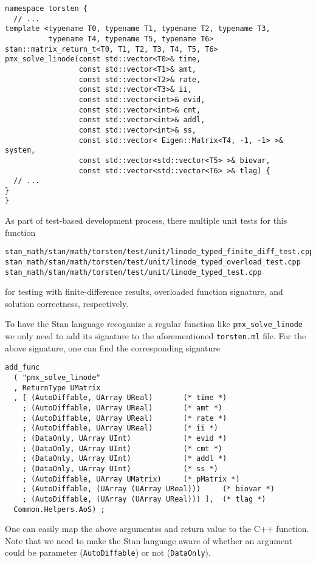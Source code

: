 \documentclass[12pt, reqno, oneside]{amsbook}
\numberwithin{equation}{chapter}
\numberwithin{figure}{chapter}
\numberwithin{table}{chapter}
\theoremstyle{remark}
\begin{document}
\begin{verbatim}
namespace torsten {
  // ...
template <typename T0, typename T1, typename T2, typename T3,
          typename T4, typename T5, typename T6>
stan::matrix_return_t<T0, T1, T2, T3, T4, T5, T6>
pmx_solve_linode(const std::vector<T0>& time,
                 const std::vector<T1>& amt,
                 const std::vector<T2>& rate,
                 const std::vector<T3>& ii,
                 const std::vector<int>& evid,
                 const std::vector<int>& cmt,
                 const std::vector<int>& addl,
                 const std::vector<int>& ss,
                 const std::vector< Eigen::Matrix<T4, -1, -1> >& system,
                 const std::vector<std::vector<T5> >& biovar,
                 const std::vector<std::vector<T6> >& tlag) {
  // ...
}
}
\end{verbatim}

As part of test-based development process, there multiple unit tests for this function
\begin{verbatim}
stan_math/stan/math/torsten/test/unit/linode_typed_finite_diff_test.cpp
stan_math/stan/math/torsten/test/unit/linode_typed_overload_test.cpp
stan_math/stan/math/torsten/test/unit/linode_typed_test.cpp
\end{verbatim}
for testing with finite-difference results, overloaded function
signature, and solution correctness, respectively.

To have the Stan language recoganize a regular function like
\texttt{pmx\_solve\_linode} we only need to add its signature to the
aforementioned \texttt{torsten.ml} file. For the above signature, one can
find the corresponding signature
\begin{verbatim}
add_func
  ( "pmx_solve_linode"
  , ReturnType UMatrix
  , [ (AutoDiffable, UArray UReal)       (* time *)
    ; (AutoDiffable, UArray UReal)       (* amt *)
    ; (AutoDiffable, UArray UReal)       (* rate *)
    ; (AutoDiffable, UArray UReal)       (* ii *)
    ; (DataOnly, UArray UInt)            (* evid *)
    ; (DataOnly, UArray UInt)            (* cmt *)
    ; (DataOnly, UArray UInt)            (* addl *)
    ; (DataOnly, UArray UInt)            (* ss *)
    ; (AutoDiffable, UArray UMatrix)     (* pMatrix *)
    ; (AutoDiffable, (UArray (UArray UReal)))     (* biovar *)
    ; (AutoDiffable, (UArray (UArray UReal))) ],  (* tlag *)
  Common.Helpers.AoS) ;
\end{verbatim}
One can easily map the above argumentss and return value to the C++
function. Note that we need to make the Stan language aware of whether
an argument could be parameter (\texttt{AutoDiffable}) or not (\texttt{DataOnly}).
\end{document}

